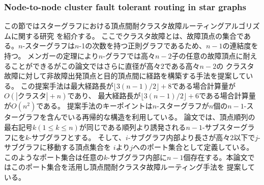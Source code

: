 \documentclass[11pt,a4j]{jsarticle}
\theoremstyle{plain}
\begin{document}
\subsubsection{Node-to-node cluster fault tolerant routing in star graphs}
この節ではスターグラフにおける頂点間耐クラスタ故障ルーティングアルゴリズムに関する研究 \cite{star-n2n}を紹介する。
ここでクラスタ故障とは、故障頂点の集合である。$n$-スターグラフは$n$-1の次数を持つ正則グラフであるため、$n-1$の連結度を持つ。
メンガーの定理により$n$-グラフでは高々$n-2$子の任意の故障頂点に耐えることができるがこの論文ではさらに直径が高々$2$である高々$n-2$の
クラスタ故障に対して非故障出発頂点と目的頂点間に経路を構築する手法を提案している。
この提案手法は最大経路長が$\lfloor3(n - 1) /2 \rfloor +8$である場合計算量が$O(|クラスタ| + n)$であり、
最大経路長が$\lfloor3(n - 1) /2 \rfloor +6$である場合計算量が$O(n^2)$である。
提案手法のキーポイントは$n$-スターグラフが$n$個の$n-1$-スターグラフを含んでいる再帰的な構造を利用している。
論文では、頂点順列の最右記号$k( 1 \leq k \leq n )$が同じである順列より誘発される$n-1$-サブスターグラフにを$k$-サブグラフとする。
そして、$i$-サブグラフ内部より長さが高々$2$以下で$j$-サブグラフに移動する頂点集合を $i$より$j$へのポート集合として定義している。
このようなポート集合は任意の$k$-サブグラフ内部に$n-1$個存在する。本論文ではこのポート集合を活用し頂点間耐クラスタ故障ルーティング手法を
提案している。
\end{document}
